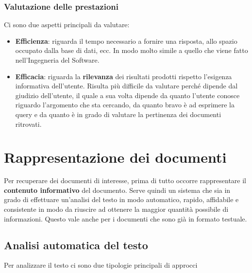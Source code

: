 \subsection{Valutazione delle prestazioni}

Ci sono due aspetti principali da valutare:

\begin{itemize}
	\item \textbf{Efficienza}: riguarda il tempo necessario a fornire una risposta, allo spazio occupato dalla base di dati, ecc. In modo molto simile a quello che viene fatto nell'Ingegneria del Software.
	\item \textbf{Efficacia}: riguarda la \textbf{rilevanza} dei risultati prodotti rispetto l'esigenza informativa dell'utente. Risulta più difficile da valutare perché dipende dal giudizio dell'utente, il quale a sua volta dipende da quanto l'utente conosce riguardo l'argomento che sta cercando, da quanto bravo è ad esprimere la query e da quanto è in grado di valutare la pertinenza dei documenti ritrovati.
\end{itemize}


\chapter{Rappresentazione dei documenti}

Per recuperare dei documenti di interesse, prima di tutto occorre rappresentare il \textbf{contenuto informativo} del documento.
Serve quindi un sistema che sia in grado di effettuare un'analisi del testo in modo automatico, rapido, affidabile e consistente in modo da riuscire ad ottenere la maggior quantità possibile di informazioni.
Questo vale anche per i documenti che sono già in formato testuale.

\section{Analisi automatica del testo}

Per analizzare il testo ci sono due tipologie principali di approcci

